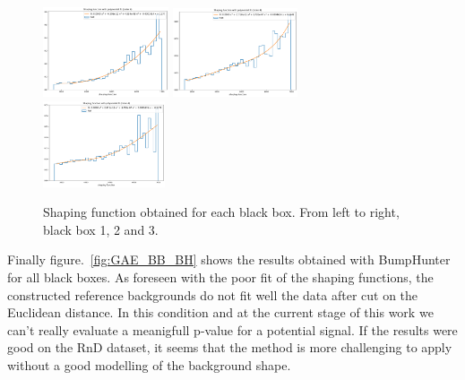 \documentclass[letterpaper,11pt]{article}
\begin{document}
\begin{figure}[h!]
\centering
\includegraphics[width=0.33\textwidth]{img/shaping_func_BB1.pdf}
\includegraphics[width=0.33\textwidth]{img/shaping_func_BB2.pdf}
\includegraphics[width=0.32\textwidth]{img/shaping_func_BB3.pdf}
\caption{Shaping function obtained for each black box.  From left to right, black box 1, 2 and 3.}
\label{fig:GAE_BB_shape}
\end{figure}

\noindent Finally figure.~\ref{fig:GAE_BB_BH} shows the results obtained with BumpHunter for all black boxes.
As foreseen with the poor fit of the shaping functions, the constructed reference backgrounds do not fit well the data after cut on the Euclidean distance.
In this condition and at the current stage of this work we can't really evaluate a meanigfull p-value for a potential signal.
If the results were good on the RnD dataset, it seems that the method is more challenging to apply without a good modelling of the background shape.
\end{document}
